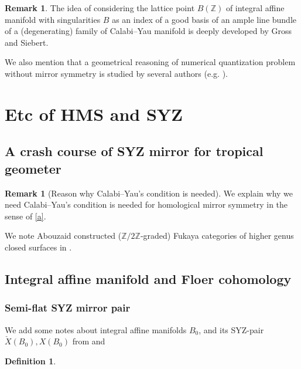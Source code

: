 \documentclass[a4paper,dvipdfmx,reqno,12pt]{amsart}
\theoremstyle{definition}
\newtheorem{definition}[theorem]{Definition}
\newtheorem{remark}[theorem]{Remark}
\newcommand{\Z}{\mathbb{Z}}%
\numberwithin{equation}{section}
\begin{document}
\begin{remark}

The idea of considering the lattice point $B(\Z)$ of 
integral affine manifold with singularities $B$ as 
an index of a good basis of an ample line bundle of 
a (degenerating) family of Calabi--Yau manifold is 
deeply developed by Gross and Siebert. 




We also mention that a geometrical reasoning 
of numerical quantization problem without
mirror symmetry is studied by several authors (e.g. \cite{MR2879247,
https://doi.org/10.48550/arxiv.1904.04076}).
\end{remark}



\section{Etc of HMS and SYZ}

\subsection{A crash course of SYZ mirror for tropical 
geometer}

\begin{remark}[{Reason why Calabi--Yau's condition is needed}]

We explain why we need Calabi--Yau's condition is needed for
homological mirror symmetry in the sense of \cref{a}.

We note Abouzaid constructed ($\Z/2\Z$-graded)
Fukaya categories of higher genus closed surfaces in
\cite{MR2383898}. 
\end{remark}





\subsection{Integral affine manifold and Floer cohomology}

\subsubsection{Semi-flat SYZ mirror pair}

We add some notes about integral affine manifolds $B_0$, and its SYZ-pair $\check{X}(B_0), X(B_0)$ from \cite[Chapter 6]{MR2567952} and \cite{MR2737696,MR3079343}

\begin{definition}
\label{definition-SYZ-torus-fibration}
\end{definition}
\end{document}

